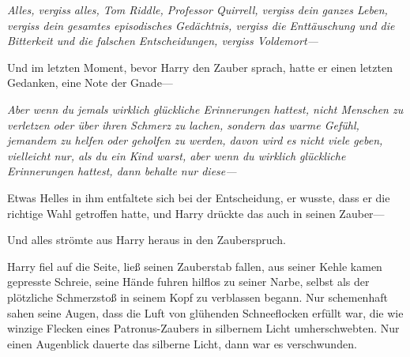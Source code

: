 \emph{Alles, vergiss alles, Tom Riddle, Professor Quirrell, vergiss dein ganzes Leben, vergiss dein gesamtes episodisches Gedächtnis, vergiss die Enttäuschung und die Bitterkeit und die falschen Entscheidungen, vergiss Voldemort—}

Und im letzten Moment, bevor Harry den Zauber sprach, hatte er einen letzten Gedanken, eine Note der Gnade—

\emph{Aber wenn du jemals wirklich glückliche Erinnerungen hattest, nicht Menschen zu verletzen oder über ihren Schmerz zu lachen, sondern das warme Gefühl, jemandem zu helfen oder geholfen zu werden, davon wird es nicht viele geben, vielleicht nur, als du ein Kind warst, aber wenn du wirklich glückliche Erinnerungen hattest, dann behalte nur diese—}

Etwas Helles in ihm entfaltete sich bei der Entscheidung, er wusste, dass er die richtige Wahl getroffen hatte, und Harry drückte das auch in seinen Zauber—


Und alles strömte aus Harry heraus in den Zauberspruch.

Harry fiel auf die Seite, ließ seinen Zauberstab fallen, aus seiner Kehle kamen gepresste Schreie, seine Hände fuhren hilflos zu seiner Narbe, selbst als der plötzliche Schmerzstoß in seinem Kopf zu verblassen begann.
Nur schemenhaft sahen seine Augen, dass die Luft von glühenden Schneeflocken erfüllt war, die wie winzige Flecken eines Patronus-Zaubers in silbernem Licht umherschwebten.
Nur einen Augenblick dauerte das silberne Licht, dann war es verschwunden.

